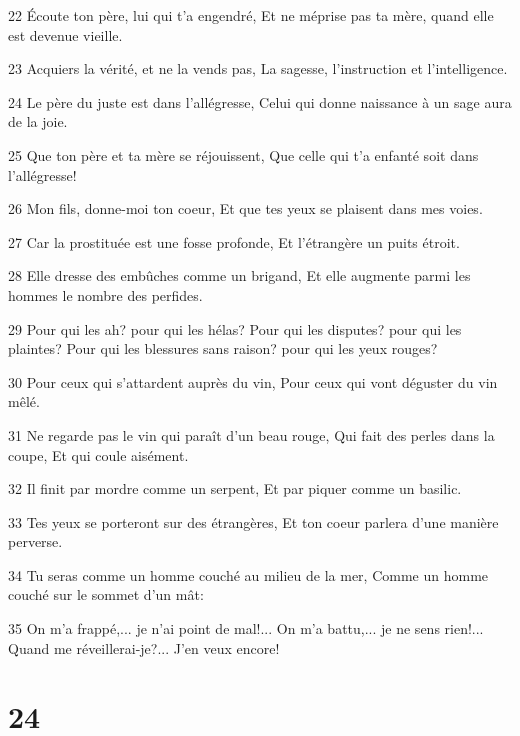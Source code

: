 \par 22 Écoute ton père, lui qui t'a engendré, Et ne méprise pas ta mère, quand elle est devenue vieille.
\par 23 Acquiers la vérité, et ne la vends pas, La sagesse, l'instruction et l'intelligence.
\par 24 Le père du juste est dans l'allégresse, Celui qui donne naissance à un sage aura de la joie.
\par 25 Que ton père et ta mère se réjouissent, Que celle qui t'a enfanté soit dans l'allégresse!
\par 26 Mon fils, donne-moi ton coeur, Et que tes yeux se plaisent dans mes voies.
\par 27 Car la prostituée est une fosse profonde, Et l'étrangère un puits étroit.
\par 28 Elle dresse des embûches comme un brigand, Et elle augmente parmi les hommes le nombre des perfides.
\par 29 Pour qui les ah? pour qui les hélas? Pour qui les disputes? pour qui les plaintes? Pour qui les blessures sans raison? pour qui les yeux rouges?
\par 30 Pour ceux qui s'attardent auprès du vin, Pour ceux qui vont déguster du vin mêlé.
\par 31 Ne regarde pas le vin qui paraît d'un beau rouge, Qui fait des perles dans la coupe, Et qui coule aisément.
\par 32 Il finit par mordre comme un serpent, Et par piquer comme un basilic.
\par 33 Tes yeux se porteront sur des étrangères, Et ton coeur parlera d'une manière perverse.
\par 34 Tu seras comme un homme couché au milieu de la mer, Comme un homme couché sur le sommet d'un mât:
\par 35 On m'a frappé,... je n'ai point de mal!... On m'a battu,... je ne sens rien!... Quand me réveillerai-je?... J'en veux encore!

\chapter{24}

